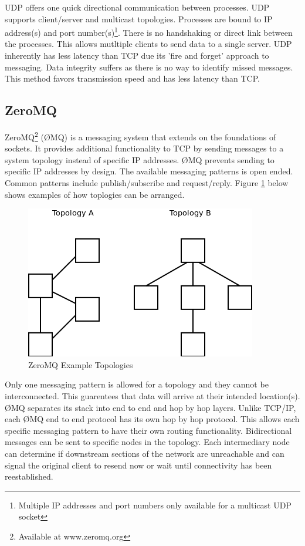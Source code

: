 UDP offers one quick directional communication between processes. UDP supports client/server and multicast topologies. Processes are bound to IP address(s) and port number(s)\footnote{Multiple IP addresses and port numbers only available for a multicast UDP socket}. There is no handshaking or direct link between the processes. This allows mutltiple clients to send data to a single server. UDP inherently has less latency than TCP due its 'fire and forget' approach to messaging. Data integrity suffers as there is no way to identify missed messages. This method favors transmission speed and has less latency than TCP.

\subsection{ZeroMQ}

ZeroMQ\footnote{Available at www.zeromq.org} (ØMQ) is a messaging system that extends on the foundations of sockets. It provides additional functionality to TCP by sending messages to a system topology instead of specific IP addresses. ØMQ prevents sending to specific IP addresses by design. The available messaging patterns is open ended. Common patterns include publish/subscribe and request/reply. Figure \ref{fig:zmq top} below shows examples of how toplogies can be arranged.

\begin{figure}[thpb]
 \centering
 \includegraphics[width=1.0\columnwidth]{./images/zmqtopology.png}
  \caption{ZeroMQ Example Topologies}
  \label{fig:zmq top}
\end{figure} 

Only one messaging pattern is allowed for a topology and they cannot be interconnected. This guarentees that data will arrive at their intended location(s). ØMQ separates its stack into end to end and hop by hop layers. Unlike TCP/IP, each ØMQ end to end protocol has its own hop by hop protocol\cite{ZMQTHEORY}. This allows each specific messaging pattern to have their own routing functionality. Bidirectional messages can be sent to specific nodes in the topology. Each intermediary node can determine if downstream sections of the network are unreachable and can signal the original client to resend now or wait until connectivity has been reestablished. 

